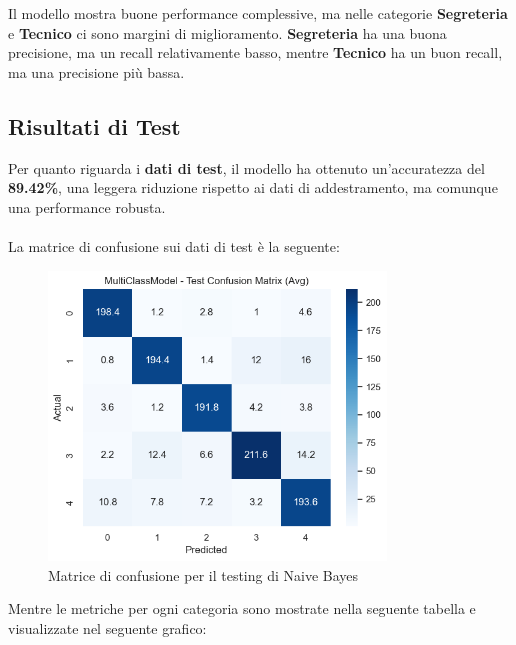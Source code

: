 Il modello mostra buone performance complessive, ma nelle categorie \textbf{Segreteria} e \textbf{Tecnico} ci sono margini di miglioramento. \textbf{Segreteria} ha una buona precisione, ma un recall relativamente basso, mentre \textbf{Tecnico} ha un buon recall, ma una precisione più bassa.

\newpage

\subsection{Risultati di Test}

Per quanto riguarda i \textbf{dati di test}, il modello ha ottenuto un'accuratezza del \textbf{89.42\%}, una leggera riduzione rispetto ai dati di addestramento, ma comunque una performance robusta. \\ \\
La matrice di confusione sui dati di test è la seguente:

\begin{figure}[H]
    \centering
    \includegraphics[width=0.8\textwidth]{images/confusion_matrix_test_naive_bayes.png}
    \caption{Matrice di confusione per il testing di Naive Bayes}
    \label{fig:confusion_matrix_test_naive_bayes}
\end{figure}

Mentre le metriche per ogni categoria sono mostrate nella seguente tabella e visualizzate nel seguente grafico:

